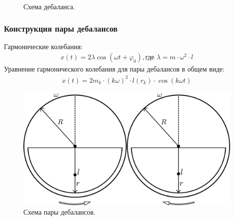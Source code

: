 \documentclass[10pt, pdf, hyperref={unicode}]{beamer}
\begin{document}
\begin{frame}
\begin{center}
\begin{minipage}[h]{0.97\linewidth}
\begin{minipage}[h]{0.36\linewidth}
\begin{figure}[h]
                        \caption{Схема дебаланса.}
                    \end{figure}
                \end{minipage}
            \end{minipage}
        \end{center}
    \end{frame}


    \begin{frame}
        \frametitle{Конструкция пары дебалансов}
        \begin{center}
            \begin{minipage}[h]{0.97\linewidth}
                Гармонические колебания:
                \begin{equation*}
                    \begin{gathered}
                        x(t) = 2 \lambda \cos (\omega t + \varphi_0), \textrm{где } \lambda = m \cdot \omega^2 \cdot l
                    \end{gathered}
                \end{equation*}
                Уравнение гармонического колебания для пары дебалансов в общем виде:
                \begin{equation*}
                    \begin{aligned}
                        x(t) = 2 m_k \cdot (k \omega)^2 \cdot l(r_k) \cdot \cos (k \omega t)
                    \end{aligned}
                \end{equation*}
                \begin{figure}[h]
                    \centering
                    \includegraphics[width=0.52\linewidth]{../img/double_debalance.png}
                    \caption{Схема пары дебалансов.}
                \end{figure}
            \end{minipage}
        \end{center}
    \end{frame}
\end{document}
